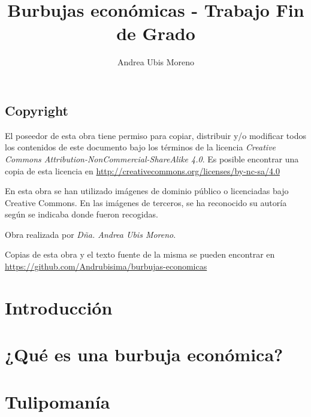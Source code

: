 \documentclass[a4paper,11pt]{scrbook} %
\title{Burbujas económicas - Trabajo Fin de Grado}
\author{Andrea Ubis Moreno}
\begin{document}



\section*{Copyright}
El poseedor de esta obra tiene permiso para copiar, distribuir y/o modificar todos los contenidos de este documento bajo los términos de la licencia \emph{Creative Commons Attribution-NonCommercial-ShareAlike 4.0}. Es posible encontrar una copia de esta licencia en \url{http://creativecommons.org/licenses/by-nc-sa/4.0}

En esta obra se han utilizado imágenes de dominio público o licenciadas bajo Creative Commons. En las imágenes de terceros, se ha reconocido su autoría según se indicaba donde fueron recogidas.

Obra realizada por \emph{Dña. Andrea Ubis Moreno}.

Copias de esta obra y el texto fuente de la misma se pueden encontrar en \url{https://github.com/Andrubisima/burbujas-economicas}


\frontmatter                                              %





\tableofcontents

\listoffigures
\listoftables

\chapter{Introducción}




\mainmatter                                               %

\chapter{¿Qué es una burbuja económica?}


\chapter{Tulipomanía}
\end{document}
